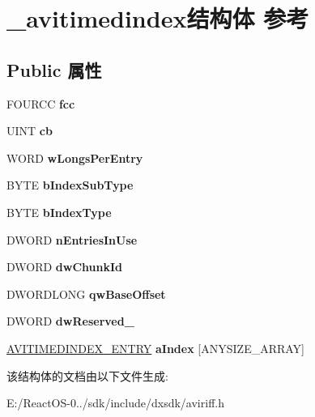 \hypertarget{struct__avitimedindex}{}\section{\+\_\+avitimedindex结构体 参考}
\label{struct__avitimedindex}
\subsection*{Public 属性}
\begin{DoxyCompactItemize}
\item 
\mbox{\label{struct__avitimedindex_a5ce446e937debe1e8fd0c858b0079b38}} 
F\+O\+U\+R\+CC {\bfseries fcc}
\item 
\mbox{\label{struct__avitimedindex_a76908f8bef6dac089277ed3533846663}} 
U\+I\+NT {\bfseries cb}
\item 
\mbox{\label{struct__avitimedindex_a3dfe9228b63262136c4e4da76d54bb33}} 
W\+O\+RD {\bfseries w\+Longs\+Per\+Entry}
\item 
\mbox{\label{struct__avitimedindex_a5b51c15f8e954981bdb69dd8c68d2abb}} 
B\+Y\+TE {\bfseries b\+Index\+Sub\+Type}
\item 
\mbox{\label{struct__avitimedindex_a41bdea90f3b48de9de54997ff5d2802b}} 
B\+Y\+TE {\bfseries b\+Index\+Type}
\item 
\mbox{\label{struct__avitimedindex_aff2c009238c5c793cff7c42982fc8f45}} 
D\+W\+O\+RD {\bfseries n\+Entries\+In\+Use}
\item 
\mbox{\label{struct__avitimedindex_a089c8babed283591082112641a5c5f80}} 
D\+W\+O\+RD {\bfseries dw\+Chunk\+Id}
\item 
\mbox{\label{struct__avitimedindex_a8fb27ee1e34ae70fcb6af0336d9b4836}} 
D\+W\+O\+R\+D\+L\+O\+NG {\bfseries qw\+Base\+Offset}
\item 
\mbox{\label{struct__avitimedindex_a2537656c5c94de374c8b8e045ec685d1}} 
D\+W\+O\+RD {\bfseries dw\+Reserved\+\_}
\item 
\mbox{\label{struct__avitimedindex_ad0ad71343c081604fb653039dd456c03}} 
\hyperlink{struct__avitimedindex__entry}{A\+V\+I\+T\+I\+M\+E\+D\+I\+N\+D\+E\+X\+\_\+\+E\+N\+T\+RY} {\bfseries a\+Index} \mbox{[}A\+N\+Y\+S\+I\+Z\+E\+\_\+\+A\+R\+R\+AY\mbox{]}
\end{DoxyCompactItemize}


该结构体的文档由以下文件生成\+:\begin{DoxyCompactItemize}
\item 
E\+:/\+React\+O\+S-\/0../sdk/include/dxsdk/aviriff.\+h\end{DoxyCompactItemize}

